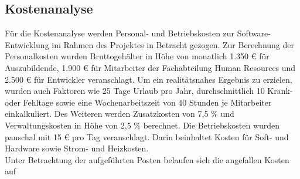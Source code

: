 \vfill
\pagebreak

\subsection{Kostenanalyse}
    Für die Kostenanalyse werden Personal- und Betriebskosten zur Software-Entwicklung im Rahmen des Projektes in Betracht gezogen. Zur Berechnung der Personalkosten wurden Bruttogehälter in Höhe von monatlich 1.350 € für Auszubildende, 1.900 € für Mitarbeiter der Fachabteilung Human Resources und 2.500 € für Entwickler veranschlagt. Um ein realitätsnahes Ergebnis zu erzielen, wurden auch Faktoren wie 25 Tage Urlaub pro Jahr, durchschnittlich 10 Krank- oder Fehltage sowie eine Wochenarbeitszeit von 40 Stunden je Mitarbeiter einkalkuliert. Des Weiteren werden Zusatzkosten von 7,5 \% und Verwaltungskosten in Höhe von 2,5 \% berechnet. Die Betriebskosten wurden pauschal mit 15 € pro Tag veranschlagt. Darin beinhaltet Kosten für Soft- und Hardware sowie Strom- und Heizkosten.\\
    Unter Betrachtung der aufgeführten Posten belaufen sich die angefallen Kosten auf
